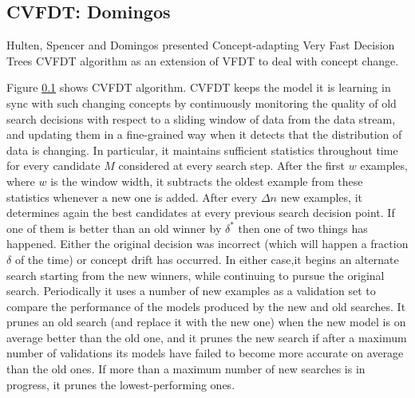 \subsection{CVFDT: Domingos}
\label{CVFDT}
Hulten, Spencer and Domingos presented Concept-adapting Very Fast Decision Trees CVFDT \cite{hulten-mining} algorithm as an extension of VFDT to deal with concept change. 


Figure \ref{CVFDT} shows CVFDT algorithm.
 CVFDT keeps the
model it is learning in sync with such changing concepts by continuously monitoring the quality of old search decisions with respect to a sliding window of data from the data stream, and updating them in a fine-grained way when it detects that the distribution of data is changing. In particular, it maintains sufficient statistics throughout time for every candidate $M$ considered at every search step. After the first $w$ examples, where $w$ is the window width,
it subtracts the oldest example from these statistics whenever a new one is added. After every $\Delta n$ new examples, it determines again the best candidates at every previous search decision point. If one of them is better than an old winner by $\delta^*$ then one of two things has
happened. Either the original decision was incorrect (which will happen a fraction $\delta$ of the time) or concept drift has occurred. In either case,it begins an alternate search starting
from the new winners, while continuing to pursue the original search. Periodically it uses
a number of new examples as a validation set to compare the performance of the models
produced by the new and old searches. It prunes an old search (and replace it with the
new one) when the new model is on average better than the old one, and it prunes the new 
search if after a maximum number of validations its models have failed to become more
accurate on average than the old ones. If more than a maximum number of new searches is
in progress, it prunes the lowest-performing ones.

